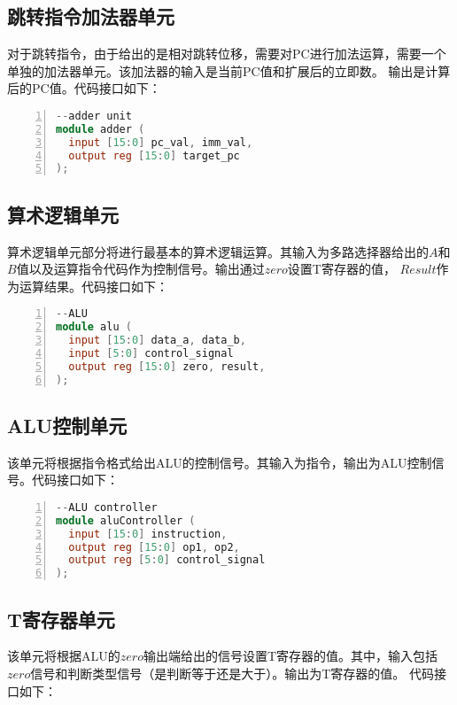 \subsection{跳转指令加法器单元}
对于跳转指令，由于给出的是相对跳转位移，需要对PC进行加法运算，需要一个单独的加法器单元。该加法器的输入是当前PC值和扩展后的立即数。
输出是计算后的PC值。代码接口如下：

\begin{lstlisting}[language=verilog,frame=single,breaklines,breaklines,basicstyle=\footnotesize\ttfamily,numbers=left]
--adder unit
module adder (
  input [15:0] pc_val, imm_val,
  output reg [15:0] target_pc
);
\end{lstlisting}

\subsection{算术逻辑单元}
算术逻辑单元部分将进行最基本的算术逻辑运算。其输入为多路选择器给出的$A$和$B$值以及运算指令代码作为控制信号。输出通过$zero$设置T寄存器的值，
$Result$作为运算结果。代码接口如下：

\begin{lstlisting}[language=verilog,frame=single,breaklines,breaklines,basicstyle=\footnotesize\ttfamily,numbers=left]
--ALU
module alu (
  input [15:0] data_a, data_b,
  input [5:0] control_signal
  output reg [15:0] zero, result,
);
\end{lstlisting}

\subsection{ALU控制单元}
该单元将根据指令格式给出ALU的控制信号。其输入为指令，输出为ALU控制信号。代码接口如下：

\begin{lstlisting}[language=verilog,frame=single,breaklines,breaklines,basicstyle=\footnotesize\ttfamily,numbers=left]
--ALU controller
module aluController (
  input [15:0] instruction,
  output reg [15:0] op1, op2,
  output reg [5:0] control_signal
);
\end{lstlisting}

\subsection{T寄存器单元}
该单元将根据ALU的$zero$输出端给出的信号设置T寄存器的值。其中，输入包括$zero$信号和判断类型信号（是判断等于还是大于）。输出为T寄存器的值。
代码接口如下：

